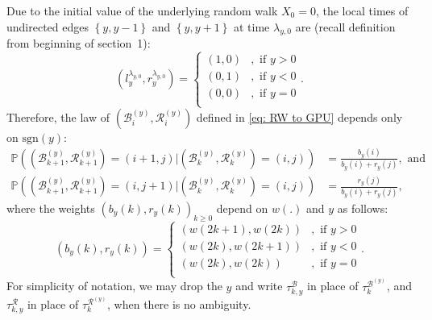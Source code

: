 \documentclass[EJP]{ejpecp} %
\begin{document}
Due to the initial value of the underlying random walk $X_0=0$, the local times of undirected edges $\left\{y,y-1\right\}$ and $\left\{y,y+1\right\}$ at time $\lambda_{y,0}$ are 
(recall definition from beginning of section~1):
\begin{equation}\label{eq: initial condition}
	\left(l_y^{\lambda_{y,0}},  r_y^{\lambda_{y,0}}\right) =  \begin{cases}	
		(1, 0) &,  \text{ if }  y>0 \\
		(0, 1) &,  \text{ if }  y<0 \\  
		(0, 0) &,  \text{ if }  y=0 \\
	\end{cases} 
	.\end{equation}	
Therefore, the law of $\left(\mathscr{B}_{i}^{(y)},\mathscr{R}_{i}^{(y)} \right)$ defined in \eqref{eq: RW to GPU} depends only on $\text{sgn}(y)$:
\begin{align*}\label{eq: transition prob for GPU}
	\mathbb{P} \left(\left(\mathscr{B}^{(y)}_{k+1},\mathscr{R}^{(y)}_{k+1} \right)=  (i+1,j) \vert \left(\mathscr{B}^{(y)}_{k},\mathscr{R}^{(y)}_{k}\right) =(i,j)  \right) &= \frac{b_y(i)}{b_y(i)+r_y(j)}, \mbox{ and}  \\
	\mathbb{P} \left( \left(\mathscr{B}^{(y)}_{k+1},\mathscr{R}^{(y)}_{k+1}\right)=  (i,j+1) \vert \left(\mathscr{B}^{(y)}_{k},\mathscr{R}^{(y)}_{k}\right) =(i,j)  \right) &= \frac{r_y(j)}{b_y(i)+r_y(j)},
\end{align*} 
where the weights $(b_y(k),r_y(k))_{k\geq 0}$ depend on $w(.)$ and $y$ as follows:
\begin{equation}\label{eq: generalized weights}
	(b_y(k), r_y(k)) = \begin{cases}
		(w(2k+1), w(2k)) &,  \text{ if }  y>0 \\
		(w(2k), w(2k+1)) &,  \text{ if }  y<0 \\  
		(w(2k), w(2k)) &,  \text{ if }  y=0 \\ 
	\end{cases}.
\end{equation}
For simplicity of notation, we may drop the $y$ and write $\tau_{k,y}^{\mathscr{B}}$ in place of $\tau_k^{\mathscr{B}^{(y)}}$, and $\tau_{k,y}^{\mathscr{R}}$ in place of $\tau_k^{\mathscr{R}^{(y)}}$, when there is no ambiguity.
\end{document}
